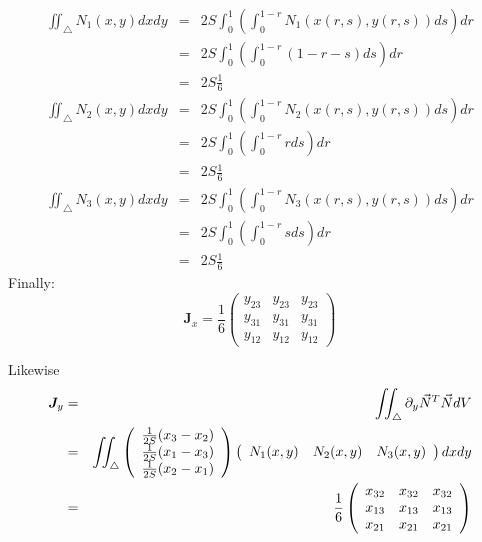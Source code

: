 \begin{eqnarray}
\iint_\triangle N_1(x,y) dx dy 
&=& 2S \int_0^{1} \left(\int_0^{1-r} N_1(x(r,s),y(r,s))  ds \right) dr \\ 
&=& 2S \int_0^{1} \left(\int_0^{1-r} (1-r-s)  ds \right) dr \\ 
&=& 2S \frac{1}{6} \\ 
\iint_\triangle N_2(x,y) dx dy 
&=& 2S \int_0^{1} \left(\int_0^{1-r} N_2(x(r,s),y(r,s))  ds \right) dr \\ 
&=& 2S \int_0^{1} \left(\int_0^{1-r} r  ds \right) dr \\ 
&=& 2S \frac{1}{6} \\ 
\iint_\triangle N_3(x,y) dx dy 
&=& 2S \int_0^{1} \left(\int_0^{1-r} N_3(x(r,s),y(r,s))  ds \right) dr \\ 
&=& 2S \int_0^{1} \left(\int_0^{1-r} s  ds \right) dr \\ 
&=& 2S \frac{1}{6} 
\end{eqnarray}
Finally:
\[
{\bm J}_x
=
\frac{1}{6}
\left(
\begin{array}{ccc}
y_{23} & y_{23} & y_{23} \\ 
y_{31} & y_{31} & y_{31} \\ 
y_{12} & y_{12} & y_{12}  
\end{array}
\right) 
\]

Likewise
\begin{eqnarray}
{\bm J}_y
&=& \iint_\triangle  \partial_y \vec{N}^T \vec{N} dV \nonumber\\
&=&  \iint_\triangle 
\left(
\begin{array}{c}
\frac{1}{2S}(x_3-x_2) \\
\frac{1}{2S}(x_1-x_3) \\
\frac{1}{2S}(x_2-x_1)
\end{array}
\right)
\left(
\begin{array}{ccc}
N_1(x,y) & N_2(x,y) & N_3(x,y) 
\end{array}
\right) dx dy \nonumber\\
&=&
\frac{1}{6}
\left(
\begin{array}{ccc}
x_{32} & x_{32} & x_{32} \\ 
x_{13} & x_{13} & x_{13} \\ 
x_{21} & x_{21} & x_{21}  
\end{array}
\right) 
\end{eqnarray}

